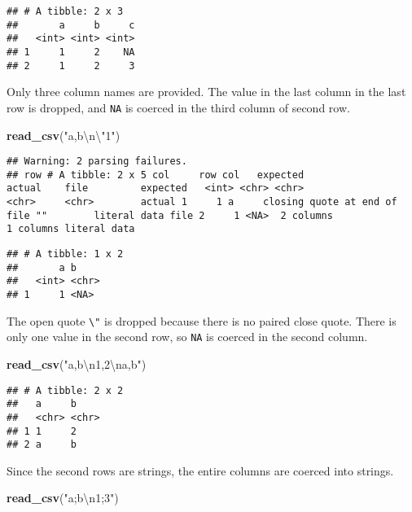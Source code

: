 \documentclass[]{article}
\newenvironment{Shaded}{\begin{snugshade}}{\end{snugshade}}
\newcommand{\KeywordTok}[1]{\textcolor[rgb]{0.13,0.29,0.53}{\textbf{#1}}}
\newcommand{\CharTok}[1]{\textcolor[rgb]{0.31,0.60,0.02}{#1}}
\newcommand{\StringTok}[1]{\textcolor[rgb]{0.31,0.60,0.02}{#1}}
\newcommand{\NormalTok}[1]{#1}
\theoremstyle{definition}
\theoremstyle{definition}
\theoremstyle{definition}
\theoremstyle{remark}
\begin{document}
\begin{verbatim}
## # A tibble: 2 x 3
##       a     b     c
##   <int> <int> <int>
## 1     1     2    NA
## 2     1     2     3
\end{verbatim}

Only three column names are provided. The value in the last column in
the last row is dropped, and \texttt{NA} is coerced in the third column
of second row.

\begin{Shaded}
\begin{Highlighting}[]
\KeywordTok{read_csv}\NormalTok{(}\StringTok{"a,b}\CharTok{\textbackslash{}n\textbackslash{}"}\StringTok{1"}\NormalTok{)}
\end{Highlighting}
\end{Shaded}

\begin{verbatim}
## Warning: 2 parsing failures.
## row # A tibble: 2 x 5 col     row col   expected                     actual    file         expected   <int> <chr> <chr>                        <chr>     <chr>        actual 1     1 a     closing quote at end of file ""        literal data file 2     1 <NA>  2 columns                    1 columns literal data
\end{verbatim}

\begin{verbatim}
## # A tibble: 1 x 2
##       a b    
##   <int> <chr>
## 1     1 <NA>
\end{verbatim}

The open quote \texttt{\textbackslash{}"} is dropped because there is no
paired close quote. There is only one value in the second row, so
\texttt{NA} is coerced in the second column.

\begin{Shaded}
\begin{Highlighting}[]
\KeywordTok{read_csv}\NormalTok{(}\StringTok{"a,b}\CharTok{\textbackslash{}n}\StringTok{1,2}\CharTok{\textbackslash{}n}\StringTok{a,b"}\NormalTok{)}
\end{Highlighting}
\end{Shaded}

\begin{verbatim}
## # A tibble: 2 x 2
##   a     b    
##   <chr> <chr>
## 1 1     2    
## 2 a     b
\end{verbatim}

Since the second rows are strings, the entire columns are coerced into
strings.

\begin{Shaded}
\begin{Highlighting}[]
\KeywordTok{read_csv}\NormalTok{(}\StringTok{"a;b}\CharTok{\textbackslash{}n}\StringTok{1;3"}\NormalTok{)}
\end{Highlighting}
\end{Shaded}
\end{document}
